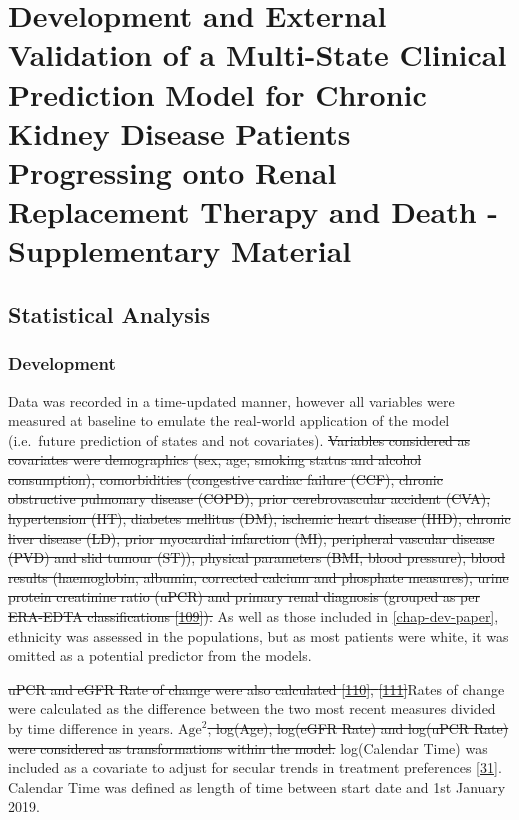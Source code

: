 \documentclass[12pt,PhD,twoside,openright]{muthesis}
\begin{document}
\hypertarget{chap-dev-paper-supp}{%
\chapter{Development and External Validation of a Multi-State Clinical Prediction Model for Chronic Kidney Disease Patients Progressing onto Renal Replacement Therapy and Death - Supplementary Material}\label{chap-dev-paper-supp}}


\hypertarget{statistical-analysis}{%
\section{Statistical Analysis}\label{statistical-analysis}}

\hypertarget{development-1}{%
\subsection{Development}\label{development-1}}

Data was recorded in a time-updated manner, however all variables were measured at baseline to emulate the real-world application of the model (i.e.~future prediction of states and not covariates). \sout{Variables considered as covariates were demographics (sex, age, smoking status and alcohol consumption), comorbidities (congestive cardiac failure (CCF), chronic obstructive pulmonary disease (COPD), prior cerebrovascular accident (CVA), hypertension (HT), diabetes mellitus (DM), ischemic heart disease (IHD), chronic liver disease (LD), prior myocardial infarction (MI), peripheral vascular disease (PVD) and slid tumour (ST)), physical parameters (BMI, blood pressure), blood results (haemoglobin, albumin, corrected calcium and phosphate measures), urine protein creatinine ratio (uPCR) and primary renal diagnosis (grouped as per ERA-EDTA classifications {[}\protect\hyperlink{ref-venkat-raman_new_2012}{109}{]}).} As well as those included in \ref{chap-dev-paper}, ethnicity was assessed in the populations, but as most patients were white, it was omitted as a potential predictor from the models.

\sout{uPCR and eGFR Rate of change were also calculated {[}\protect\hyperlink{ref-kovesdy_past_2016}{110}{]}, {[}\protect\hyperlink{ref-naimark_past_2016}{111}{]}}Rates of change were calculated as the difference between the two most recent measures divided by time difference in years. \sout{\(\textrm{Age}^2\), log(Age), log(eGFR Rate) and log(uPCR Rate) were considered as transformations within the model.} log(Calendar Time) was included as a covariate to adjust for secular trends in treatment preferences {[}\protect\hyperlink{ref-bhatnagar_epidemiology_2015}{31}{]}. Calendar Time was defined as length of time between start date and 1st January 2019.
\end{document}
